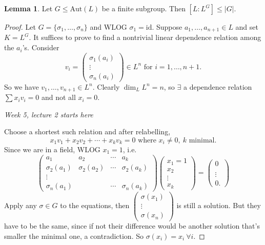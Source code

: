 \documentclass[a4paper]{article}
\newcommand{\Aut}{\text{Aut}}
\theoremstyle{definition}
\newtheorem{lemma}[defn]{Lemma}
\begin{document}
\begin{lemma}
Let $G\leq \Aut(L)$ be a finite subgroup. Then $[L:L^G]\leq |G|$.
\end{lemma}
\begin{proof}
Let $G=\{\sigma_1,\ldots,\sigma_n\}$ and WLOG $\sigma_1=\text{id}$. Suppose $a_1,\ldots,a_{n+1}\in L$ and set $K=L^G$. It suffices to prove to find a nontrivial linear dependence relation among the $a_i$'s. Consider
\[
v_i=\begin{pmatrix}
\sigma_1(a_i) \\ \vdots \\ \sigma_n(a_i)
\end{pmatrix}\in L^n \text{ for }i=1,\ldots,n+1.
\]
So we have $v_1,\ldots,v_{n+1}\in L^n$. Clearly $\dim_L L^n=n$, so $\exists$ a dependence relation $\sum x_i v_i=0$ and not all $x_i=0$.
\begin{flushright}
\textit{Week 5, lecture 2 starts here}
\end{flushright}
Choose a shortest such relation and after relabelling,
\[
x_1 v_1+x_2v_2+\cdots+x_k v_k=0\text{ where } x_i\neq 0,\ k\text{ minimal}.
\]
Since we are in a field, WLOG $x_1=1$, i.e.
\[
\begin{pmatrix}
a_1 & a_2 & \cdots & a_k \\
\sigma_2(a_1) & \sigma_2(a_2) & \cdots & \sigma_2(a_k) \\
\vdots \\
\sigma_n(a_1) & & \cdots & \sigma_n(a_k)
\end{pmatrix}
\begin{pmatrix}
x_1=1 \\ x_2 \\ \vdots \\ x_k
\end{pmatrix}=
\begin{pmatrix}
0 \\ \\ \vdots \\ 0.
\end{pmatrix}
\]
Apply any $\sigma\in G$ to the equations, then $\begin{pmatrix}
\sigma(x_1) \\ \vdots \\\sigma(x_n)
\end{pmatrix}$ is still a solution. But they have to be the same, since if not their difference would be another solution that's smaller the minimal one, a contradiction. So $\sigma(x_i)=x_i \ \forall i$.
\end{proof}
\end{document}
